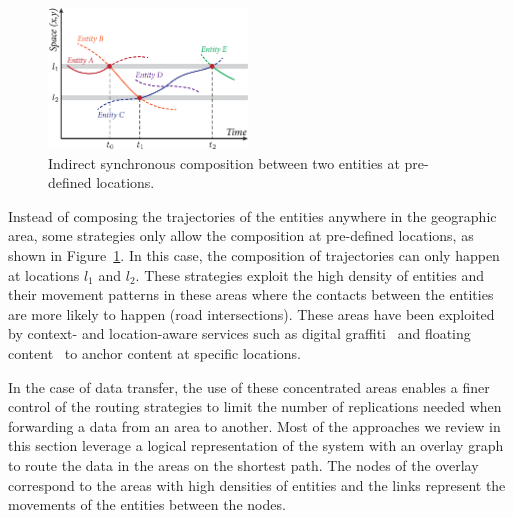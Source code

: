 \begin{figure}
    \vspace{-23pt}
    \includegraphics[width=5.3cm]{figures/dtn-indirect-sync-geo.pdf}
    \caption{Indirect synchronous composition between two entities at pre-defined locations.}
    \label{fig:dtn-indirect-sync-geo}
\end{figure}
Instead of composing the trajectories of the entities anywhere in the geographic area, some strategies only allow the composition at pre-defined locations, as shown in Figure~\ref{fig:dtn-indirect-sync-geo}. In this case, the composition of trajectories can only happen at locations $l_1$ and $l_2$. These strategies exploit the high density of entities and their movement patterns in these areas where the contacts between the entities are more likely to happen (\eg road intersections). These areas have been exploited by context- and location-aware services such as digital graffiti~\cite{carter2004digital} and floating content~\cite{ott2011floating} to anchor content at specific locations. 

In the case of data transfer, the use of these concentrated areas enables a finer control of the routing strategies to limit the number of replications needed when forwarding a data from an area to another. Most of the approaches we review in this section leverage a logical representation of the system with an overlay graph to route the data in the areas on the shortest path. The nodes of the overlay correspond to the areas with high densities of entities and the links represent the movements of the entities between the nodes. 

